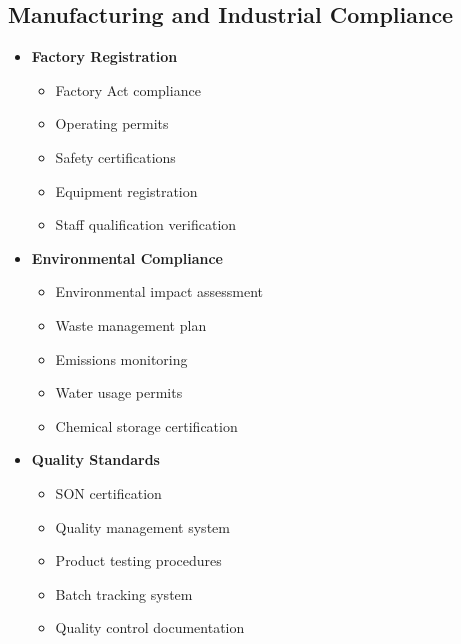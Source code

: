 \subsection{Manufacturing and Industrial Compliance}\label{subsec:manufacturing-compliance}
\vspace{1em}

\begin{tcolorbox}[
    colback=white,
    colframe=primarydark,
    title=\textbf{Manufacturing Standards and Requirements},
    before skip=1em,
    after skip=1em
]
    \begin{itemize}[leftmargin=*,itemsep=0.5em]
        \item \textbf{Factory Registration}
        \begin{itemize}[itemsep=0.3em]
            \item Factory Act compliance
            \item Operating permits
            \item Safety certifications
            \item Equipment registration
            \item Staff qualification verification
        \end{itemize}

        \vspace{0.5em}

        \item \textbf{Environmental Compliance}
        \begin{itemize}[itemsep=0.3em]
            \item Environmental impact assessment
            \item Waste management plan
            \item Emissions monitoring
            \item Water usage permits
            \item Chemical storage certification
        \end{itemize}

        \vspace{0.5em}

        \item \textbf{Quality Standards}
        \begin{itemize}[itemsep=0.3em]
            \item SON certification
            \item Quality management system
            \item Product testing procedures
            \item Batch tracking system
            \item Quality control documentation
        \end{itemize}


\end{itemize}
\end{tcolorbox}
